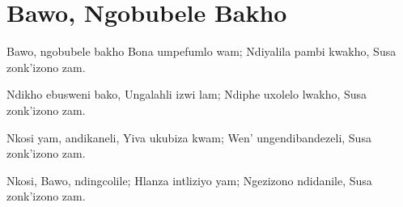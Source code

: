 \starttocol
\chapter{Bawo, Ngobubele Bakho}
\nexttocol
\hfill{\it }
\stoptocol
\starttocol
\startlines
{\sc Bawo}, ngobubele bakho
Bona umpefumlo wam;
Ndiyalila pambi kwakho,
Susa zonk'izono zam.

Ndikho ebusweni bako, 
Ungalahli izwi lam; 
Ndiphe uxolelo lwakho, 
Susa zonk'izono zam.

Nkosi yam, andikaneli, 
Yiva ukubiza kwam;
Wen' ungendibandezeli,
Susa zonk'izono zam.

Nkosi, Bawo, ndingcolile;
Hlanza intliziyo yam;
Ngezizono ndidanile,
Susa zonk'izono zam.

\stoplines
\nexttocol

\stoptocol
